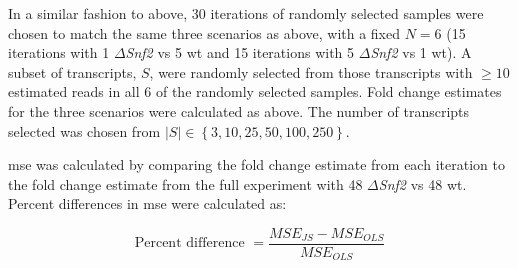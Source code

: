 In a similar fashion to above, 30 iterations of randomly selected samples were chosen to match the same three scenarios as above, with a fixed $N = 6$ (15 iterations with 1 $\Delta$\emph{Snf2} vs 5 \gls{wt} and 15 iterations with 5 $\Delta$\emph{Snf2} vs 1 \gls{wt}).
A subset of transcripts, $S$, were randomly selected from those transcripts with $\ge 10$ estimated reads in all 6 of the randomly selected samples.
Fold change estimates for the three scenarios were calculated as above.
The number of transcripts selected was chosen from $|S| \in \left\{3, 10, 25, 50, 100, 250 \right\}$.

\Gls{mse} was calculated by comparing the fold change estimate from each iteration to the fold change estimate from the full experiment with 48 $\Delta$\emph{Snf2} vs 48 \gls{wt}.
Percent differences in \gls{mse} were calculated as:

\begin{equation*}
  \text{Percent difference } = \frac{MSE_{JS} - MSE_{OLS}}{MSE_{OLS}}
\end{equation*}
